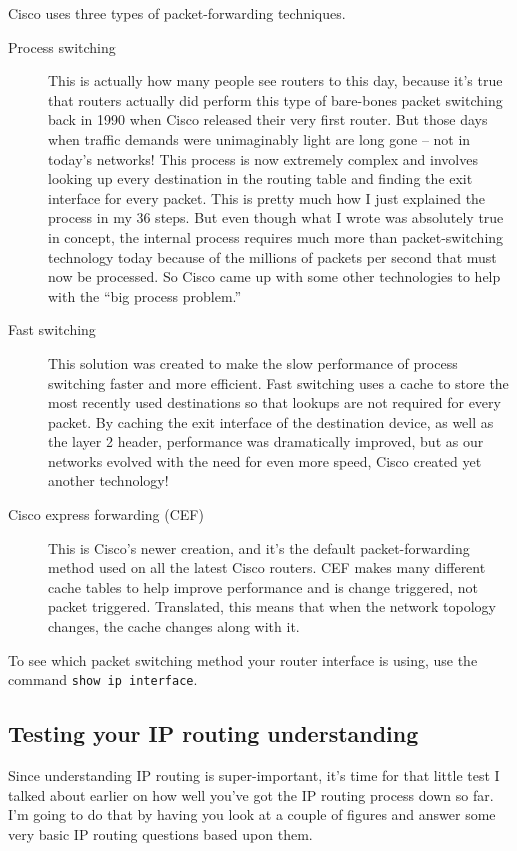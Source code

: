 Cisco uses three types of packet-forwarding techniques.
\begin{description}
\item[Process switching]
   This is actually how many people see routers to this day, because it's true that routers actually did perform this
type of bare-bones packet switching back in 1990 when Cisco released
their very first router. But those days when traffic demands were
unimaginably light are long gone -- not in today's networks! This process
is now extremely complex and involves looking up every destination in
the routing table and finding the exit interface for every packet. This
is pretty much how I just explained the process in my 36 steps. But even
though what I wrote was absolutely true in concept, the internal process
requires much more than packet-switching technology today because of the
millions of packets per second that must now be processed. So Cisco came
up with some other technologies to help with the ``big process
problem.''

\item[Fast switching]
   This solution was created to make the slow performance of process switching faster and more efficient. Fast
switching uses a cache to store the most recently used destinations so
that lookups are not required for every packet. By caching the exit
interface of the destination device, as well as the layer 2 header,
performance was dramatically improved, but as our networks evolved with
the need for even more speed, Cisco created yet another technology!

\item[Cisco express forwarding (CEF)]
   This is Cisco's newer creation, and it's the default packet-forwarding method used on all the latest
Cisco routers. CEF makes many different cache tables to help improve
performance and is change triggered, not packet triggered. Translated,
this means that when the network topology changes, the cache changes
along with it.
\end{description}


To see which packet switching method your router interface is using, use the command \texttt{show\ ip\ interface}.

\subsection{Testing your IP routing understanding}

Since understanding IP routing is super-important, it's time for that
little test I talked about earlier on how well you've got the IP routing
process down so far. I'm going to do that by having you look at a couple
of figures and answer some very basic IP routing questions based upon
them.

